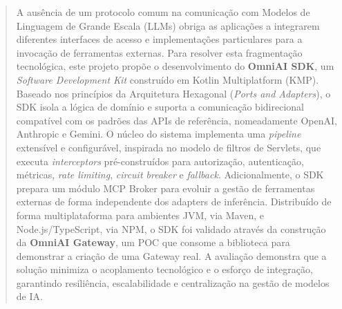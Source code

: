 \documentclass[11pt,a4paper]{report}
\begin{document}
    \begin{abstract}
        A ausência de um protocolo comum na comunicação com Modelos de Linguagem de Grande Escala (LLMs) obriga as aplicações a integrarem diferentes interfaces de acesso e implementações particulares para a invocação de ferramentas externas. Para resolver esta fragmentação tecnológica, este projeto propõe o desenvolvimento do \textbf{OmniAI SDK}, um \textit{Software Development Kit} construído em Kotlin Multiplatform (KMP). Baseado nos princípios da Arquitetura Hexagonal (\textit{Ports and Adapters}), o SDK isola a lógica de domínio e suporta a comunicação bidirecional compatível com os padrões das APIs de referência, nomeadamente OpenAI, Anthropic e Gemini. O núcleo do sistema implementa uma \textit{pipeline} extensível e configurável, inspirada no modelo de filtros de Servlets, que executa \textit{interceptors} pré-construídos para autorização, autenticação, métricas, \textit{rate limiting}, \textit{circuit breaker} e \textit{fallback}. Adicionalmente, o SDK prepara um módulo MCP Broker para evoluir a gestão de ferramentas externas de forma independente dos adapters de inferência. Distribuído de forma multiplataforma para ambientes JVM, via Maven, e Node.js/TypeScript, via NPM, o SDK foi validado através da construção da \textbf{OmniAI Gateway}, um POC que consome a biblioteca para demonstrar a criação de uma Gateway real. A avaliação demonstra que a solução minimiza o acoplamento tecnológico e o esforço de integração, garantindo resiliência, escalabilidade e centralização na gestão de modelos de IA.
    \end{abstract}
\end{document}
